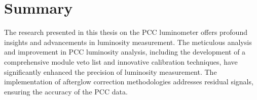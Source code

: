 \newpage

\section{Summary}

The research presented in this thesis on the PCC luminometer offers profound insights and advancements in luminosity measurement. The meticulous analysis and improvement in PCC luminosity analysis, including the development of a comprehensive module veto list and innovative calibration techniques, have significantly enhanced the precision of luminosity measurement. The implementation of afterglow correction methodologies addresses residual signals, ensuring the accuracy of the PCC data.

